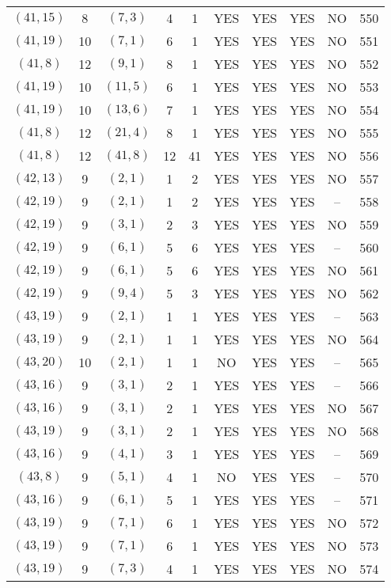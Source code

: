 \begin{longtable}{|c|c|c|c|c|c|c|c|c|c|}
$(41, 15)$ & 8 & $(7, 3)$ & 4 & 1 & YES & YES & YES & NO & 550\\
$(41, 19)$ & 10 & $(7, 1)$ & 6 & 1 & YES & YES & YES & NO & 551\\
$(41, 8)$ & 12 & $(9, 1)$ & 8 & 1 & YES & YES & YES & NO & 552\\
$(41, 19)$ & 10 & $(11, 5)$ & 6 & 1 & YES & YES & YES & NO & 553\\
$(41, 19)$ & 10 & $(13, 6)$ & 7 & 1 & YES & YES & YES & NO & 554\\
$(41, 8)$ & 12 & $(21, 4)$ & 8 & 1 & YES & YES & YES & NO & 555\\
$(41, 8)$ & 12 & $(41, 8)$ & 12 & 41 & YES & YES & YES & NO & 556\\
$(42, 13)$ & 9 & $(2, 1)$ & 1 & 2 & YES & YES & YES & NO & 557\\
$(42, 19)$ & 9 & $(2, 1)$ & 1 & 2 & YES & YES & YES & -- & 558\\
$(42, 19)$ & 9 & $(3, 1)$ & 2 & 3 & YES & YES & YES & NO & 559\\
$(42, 19)$ & 9 & $(6, 1)$ & 5 & 6 & YES & YES & YES & -- & 560\\
$(42, 19)$ & 9 & $(6, 1)$ & 5 & 6 & YES & YES & YES & NO & 561\\
$(42, 19)$ & 9 & $(9, 4)$ & 5 & 3 & YES & YES & YES & NO & 562\\
$(43, 19)$ & 9 & $(2, 1)$ & 1 & 1 & YES & YES & YES & -- & 563\\
$(43, 19)$ & 9 & $(2, 1)$ & 1 & 1 & YES & YES & YES & NO & 564\\
$(43, 20)$ & 10 & $(2, 1)$ & 1 & 1 & NO & YES & YES & -- & 565\\
$(43, 16)$ & 9 & $(3, 1)$ & 2 & 1 & YES & YES & YES & -- & 566\\
$(43, 16)$ & 9 & $(3, 1)$ & 2 & 1 & YES & YES & YES & NO & 567\\
$(43, 19)$ & 9 & $(3, 1)$ & 2 & 1 & YES & YES & YES & NO & 568\\
$(43, 16)$ & 9 & $(4, 1)$ & 3 & 1 & YES & YES & YES & -- & 569\\
$(43, 8)$ & 9 & $(5, 1)$ & 4 & 1 & NO & YES & YES & -- & 570\\
$(43, 16)$ & 9 & $(6, 1)$ & 5 & 1 & YES & YES & YES & -- & 571\\
$(43, 19)$ & 9 & $(7, 1)$ & 6 & 1 & YES & YES & YES & NO & 572\\
$(43, 19)$ & 9 & $(7, 1)$ & 6 & 1 & YES & YES & YES & NO & 573\\
$(43, 19)$ & 9 & $(7, 3)$ & 4 & 1 & YES & YES & YES & NO & 574\\

\end{longtable}
